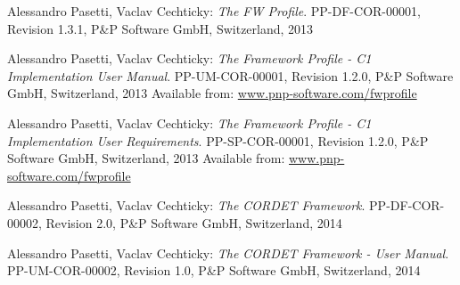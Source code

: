\documentclass{pnp_article}
\begin{document}
\clearpage

\begin{thebibliography}{6}
 
 Alessandro Pasetti, Vaclav Cechticky:
           {\sl The FW Profile}. PP-DF-COR-00001, Revision 1.3.1,
           P\&P Software GmbH, Switzerland, 2013 

 Alessandro Pasetti, Vaclav Cechticky:
           {\sl The Framework Profile - C1 Implementation User Manual}. 
           PP-UM-COR-00001, Revision 1.2.0,
           P\&P Software GmbH, Switzerland, 2013
		   Available from: \url{www.pnp-software.com/fwprofile}          
		   
 Alessandro Pasetti, Vaclav Cechticky:
           {\sl The Framework Profile - C1 Implementation User Requirements}. 
           PP-SP-COR-00001, Revision 1.2.0,
           P\&P Software GmbH, Switzerland, 2013
		   Available from: \url{www.pnp-software.com/fwprofile}          		     
           
 Alessandro Pasetti, Vaclav Cechticky:
           {\sl The CORDET Framework}. 
           PP-DF-COR-00002, Revision 2.0,
           P\&P Software GmbH, Switzerland, 2014   
           
 Alessandro Pasetti, Vaclav Cechticky:
           {\sl The CORDET Framework - User Manual}. 
           PP-UM-COR-00002, Revision 1.0,
           P\&P Software GmbH, Switzerland, 2014                  
           
\end{thebibliography}
\end{document}
